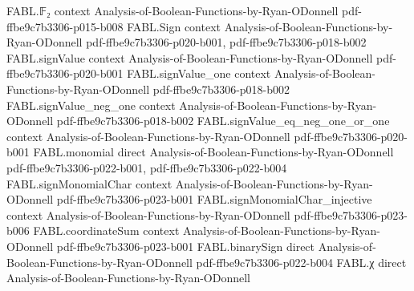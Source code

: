 \begin{theorem}
\label{FABL.fourierCoeffEstimatorProgram_failureProbability_le}
\leanok
{}
\proofstep
  {FABL.𝔽₂}
  {context}
  {Analysis-of-Boolean-Functions-by-Ryan-ODonnell}
  {pdf-ffbe9c7b3306-p015-b008}
\proofstep
  {FABL.Sign}
  {context}
  {Analysis-of-Boolean-Functions-by-Ryan-ODonnell}
  {pdf-ffbe9c7b3306-p020-b001,
    pdf-ffbe9c7b3306-p018-b002}
\proofstep
  {FABL.signValue}
  {context}
  {Analysis-of-Boolean-Functions-by-Ryan-ODonnell}
  {pdf-ffbe9c7b3306-p020-b001}
\proofstep
  {FABL.signValue_one}
  {context}
  {Analysis-of-Boolean-Functions-by-Ryan-ODonnell}
  {pdf-ffbe9c7b3306-p018-b002}
\proofstep
  {FABL.signValue_neg_one}
  {context}
  {Analysis-of-Boolean-Functions-by-Ryan-ODonnell}
  {pdf-ffbe9c7b3306-p018-b002}
\proofstep
  {FABL.signValue_eq_neg_one_or_one}
  {context}
  {Analysis-of-Boolean-Functions-by-Ryan-ODonnell}
  {pdf-ffbe9c7b3306-p020-b001}
\proofstep
  {FABL.monomial}
  {direct}
  {Analysis-of-Boolean-Functions-by-Ryan-ODonnell}
  {pdf-ffbe9c7b3306-p022-b001,
    pdf-ffbe9c7b3306-p022-b004}
\proofstep
  {FABL.signMonomialChar}
  {context}
  {Analysis-of-Boolean-Functions-by-Ryan-ODonnell}
  {pdf-ffbe9c7b3306-p023-b001}
\proofstep
  {FABL.signMonomialChar_injective}
  {context}
  {Analysis-of-Boolean-Functions-by-Ryan-ODonnell}
  {pdf-ffbe9c7b3306-p023-b006}
\proofstep
  {FABL.coordinateSum}
  {context}
  {Analysis-of-Boolean-Functions-by-Ryan-ODonnell}
  {pdf-ffbe9c7b3306-p023-b001}
\proofstep
  {FABL.binarySign}
  {direct}
  {Analysis-of-Boolean-Functions-by-Ryan-ODonnell}
  {pdf-ffbe9c7b3306-p022-b004}
\proofstep
  {FABL.χ}
  {direct}
  {Analysis-of-Boolean-Functions-by-Ryan-ODonnell}

\end{theorem}
